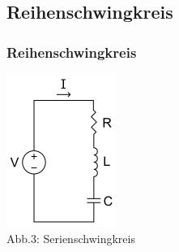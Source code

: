 \subsection*{Reihen\-schwing\-kreis}
\begin{frame}
  \frametitle{Reihenschwingkreis}
  \begin{center}
    \begin{minipage}{0.4\textwidth}
      \includegraphics[height=.5\textheight,width=\textwidth,keepaspectratio]{a04/Serirenschw.png}\\
      \tiny{Abb.3: Serienschwingkreis \cite{wmen}}
    \end{minipage}
    \begin{minipage}{0.4\textwidth}

\end{minipage}
\end{center}
\end{frame}
